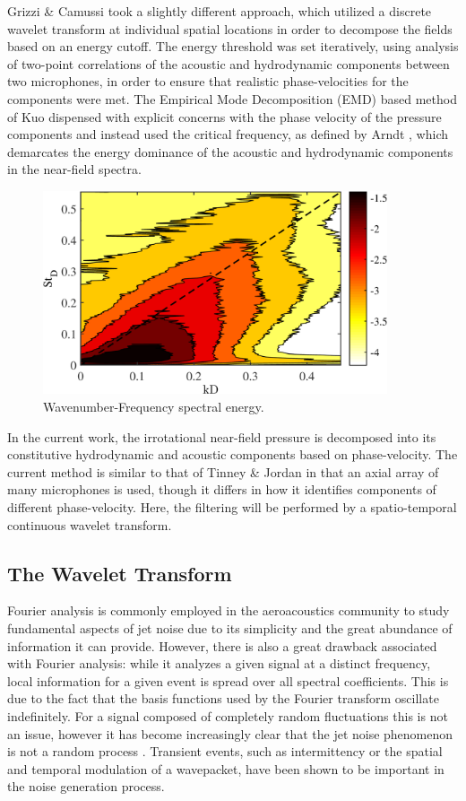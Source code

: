 Grizzi \& Camussi \citep{Grizzi2012} took a slightly different approach, which utilized a discrete wavelet transform at individual spatial locations in order to decompose the fields based on an energy cutoff. 
The energy threshold was set iteratively, using analysis of two-point correlations of the acoustic and hydrodynamic components between two microphones, in order to ensure that realistic phase-velocities for the components were met. 
The Empirical Mode Decomposition (EMD) based method of Kuo \etal \citep{Kuo2013} dispensed with explicit concerns with the phase velocity of the pressure components and instead used the critical frequency, as defined by Arndt \etal \citep{Arndt1997}, which demarcates the energy dominance of the acoustic and hydrodynamic components in the near-field spectra.
\begin{figure}
	\centering
	\includegraphics[width=4in]{Figures/Phase_Velocity_Map.png}
	\caption{Wavenumber-Frequency spectral energy.}
	\label{fig:phase_velocity_map}
\end{figure}

In the current work, the irrotational near-field pressure is decomposed into its constitutive hydrodynamic and acoustic components based on phase-velocity. 
The current method is similar to that of Tinney \& Jordan \citep{Tinney2008} in that an axial array of many microphones is used, though it differs in how it identifies components of different phase-velocity.
Here, the filtering will be performed by a spatio-temporal continuous wavelet transform.

\subsection{The Wavelet Transform}
Fourier analysis is commonly employed in the aeroacoustics community to study fundamental aspects of jet noise due to its simplicity and the great abundance of information it can provide. 
However, there is also a great drawback associated with Fourier analysis: while it analyzes a given signal at a distinct frequency, local information for a given event is spread over all spectral coefficients. 
This is due to the fact that the basis functions used by the Fourier transform oscillate indefinitely. 
For a signal composed of completely random fluctuations this is not an issue, however it has become increasingly clear that the jet noise phenomenon is not a random process \citep{Kearney-Fischer2013}.
Transient events, such as intermittency or the spatial and temporal modulation of a wavepacket, have been shown to be important in the noise generation process. 

